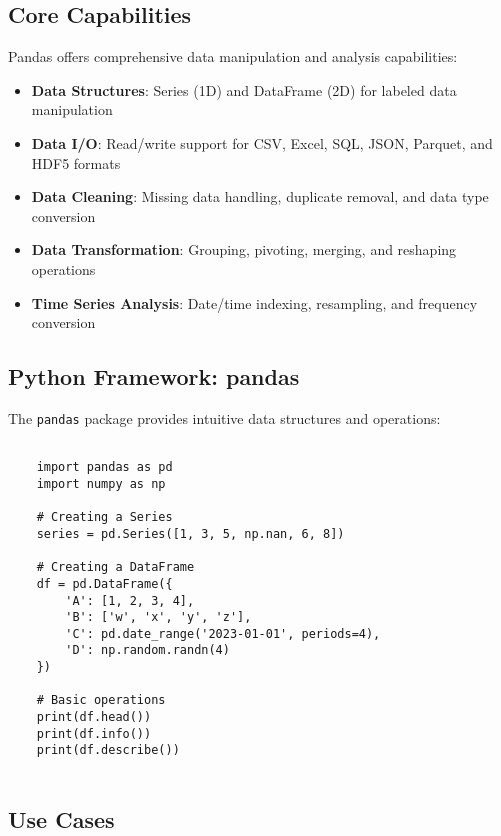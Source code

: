 \subsection{Core Capabilities}
\label{subsec:capabilities}

Pandas offers comprehensive data manipulation and analysis capabilities:

\begin{itemize}
	\item \textbf{Data Structures}: Series (1D) and DataFrame (2D) for labeled data manipulation
	\item \textbf{Data I/O}: Read/write support for CSV, Excel, SQL, JSON, Parquet, and HDF5 formats
	\item \textbf{Data Cleaning}: Missing data handling, duplicate removal, and data type conversion
	\item \textbf{Data Transformation}: Grouping, pivoting, merging, and reshaping operations
	\item \textbf{Time Series Analysis}: Date/time indexing, resampling, and frequency conversion
\end{itemize}

\clearpage

\subsection{Python Framework: pandas}
\label{subsec:pandas}

The \texttt{pandas} package provides intuitive data structures and operations:

\begin{lstlisting}[language=MyPython, caption={Pandas Core Data Structures}, label={lst:pandas_core}]
	
	import pandas as pd
	import numpy as np
	
	# Creating a Series
	series = pd.Series([1, 3, 5, np.nan, 6, 8])
	
	# Creating a DataFrame
	df = pd.DataFrame({
	    'A': [1, 2, 3, 4],
	    'B': ['w', 'x', 'y', 'z'],
	    'C': pd.date_range('2023-01-01', periods=4),
	    'D': np.random.randn(4)
	})
	
	# Basic operations
	print(df.head())
	print(df.info())
	print(df.describe())
	
\end{lstlisting}

\subsection{Use Cases}
\label{subsec:usecases}

